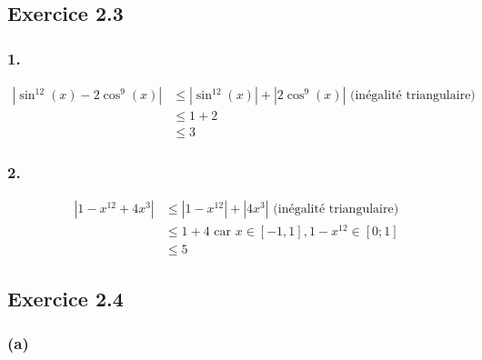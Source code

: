 \documentclass[a4paper,10pt]{report}
\begin{document}

\subsection*{Exercice 2.3}

\subsubsection*{1.}

\begin{equation*}
	\begin{split}
		|\sin^{12}(x) - 2\cos^9(x)| &\leq |\sin^{12}(x)|+ |2\cos^9(x)| \text{ (inégalité triangulaire)} \\
		                         &\leq 1 + 2 \\
		                         & \leq 3
	\end{split}
\end{equation*}

\subsubsection*{2.}

\begin{equation*}
	\begin{split}
		|1-x^{12} +4x^3| &\leq |1- x^{12}|+ |4x^3| \text{ (inégalité triangulaire)} \\
		&\leq 1 + 4 \text{ car }x \in [-1, 1], 1- x^{12} \in [0 ; 1]\\
		& \leq 5
	\end{split}
\end{equation*}


\subsection*{Exercice 2.4}

\subsubsection*{(a)}
\end{document}
